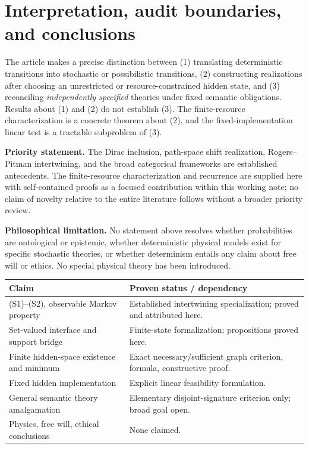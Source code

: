 \documentclass[11pt,letterpaper]{article}
\theoremstyle{definition}\newtheorem{definition}[theorem]{Definition}
\theoremstyle{remark}\newtheorem{remark}[theorem]{Remark}
\begin{document}
\section{Interpretation, audit boundaries, and conclusions}
The article makes a precise distinction between (1) translating deterministic transitions into stochastic or possibilistic transitions, (2) constructing realizations after choosing an unrestricted or resource-constrained hidden state, and (3) reconciling \emph{independently specified} theories under fixed semantic obligations. Results about (1) and (2) do not establish (3). The finite-resource characterization is a concrete theorem about (2), and the fixed-implementation linear test is a tractable subproblem of (3).

\textbf{Priority statement.} The Dirac inclusion, path-space shift realization, Rogers--Pitman intertwining, and the broad categorical frameworks are established antecedents. The finite-resource characterization and recurrence are supplied here with self-contained proofs as a focused contribution within this working note; no claim of novelty relative to the entire literature follows without a broader priority review.

\textbf{Philosophical limitation.} No statement above resolves whether probabilities are ontological or epistemic, whether deterministic physical models exist for specific stochastic theories, or whether determinism entails any claim about free will or ethics. No special physical theory has been introduced.

\begin{center}\small
\begin{tabularx}{\textwidth}{@{}p{}X@{}}\toprule
Claim & Proven status / dependency\\\midrule
(S1)--(S2), observable Markov property & Established intertwining specialization; proved and attributed here.\\
Set-valued interface and support bridge & Finite-state formalization; propositions proved here.\\
Finite hidden-space existence and minimum & Exact necessary/sufficient graph criterion, formula, constructive proof.\\
Fixed hidden implementation & Explicit linear feasibility formulation.\\
General semantic theory amalgamation & Elementary disjoint-signature criterion only; broad goal open.\\
Physics, free will, ethical conclusions & None claimed.\\\bottomrule
\end{tabularx}
\end{center}
\end{document}
